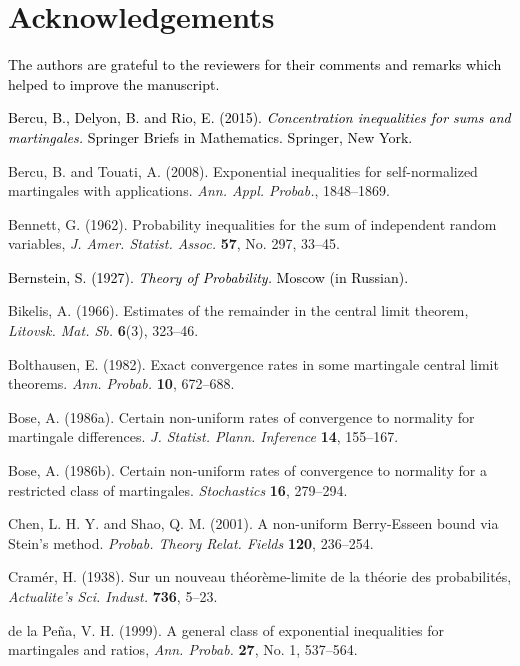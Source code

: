 \documentclass{gSTA2e}
\theoremstyle{plain}
\theoremstyle{definition}
\theoremstyle{remark}
\begin{document}
\section*{Acknowledgements}

\textcolor{black}{The authors are grateful to the reviewers for their comments and remarks which helped to improve the manuscript.}



\begin{thebibliography}{99}
 \textcolor{black}{Bercu, B., Delyon, B. and Rio, E. (2015). \emph{Concentration inequalities for sums and martingales.}
 Springer Briefs in Mathematics. Springer, New York.}

 Bercu, B. and Touati, A. (2008). Exponential inequalities for self-normalized martingales with applications. \emph{Ann. Appl. Probab.}, 1848--1869.


  Bennett, G. (1962). Probability inequalities for
the sum of independent random variables, \emph{J. Amer. Statist. Assoc.}
\textbf{57}, No. 297, 33--45.

 \textcolor{black}{Bernstein, S. (1927). \emph{Theory of Probability.} Moscow (in Russian).}

 Bikelis, A. (1966). Estimates of the remainder in the central limit theorem, \emph{Litovsk. Mat. Sb.}
\textbf{6}(3), 323--46.

 Bolthausen, E. (1982). Exact convergence rates in some
martingale central limit theorems. \emph{Ann. Probab.} \textbf{10},
672--688.

  Bose, A. (1986a). Certain non-uniform rates of
convergence to normality for martingale differences. \emph{J. Statist.
Plann. Inference} \textbf{14}, 155--167.

  Bose, A.  (1986b). Certain non-uniform rates of
convergence to normality for a restricted class of martingales. \emph{Stochastics} \textbf{16}, 279--294.

 Chen, L. H. Y. and Shao, Q. M. (2001). A non-uniform Berry-Esseen bound via Stein's
method. \emph{Probab. Theory Relat. Fields} \textbf{120}, 236--254.


 Cram\'{e}r, H. (1938). Sur un nouveau th\'{e}or\`{e}me-limite de la th\'{e}orie des probabilit\'{e}s, \emph{Actualite's Sci. Indust.} \textbf{736}, 5--23.

 de la Pe\~{n}a, V. H. (1999). A general class of exponential inequalities for martingales and ratios, \emph{Ann. Probab.} \textbf{27}, No. 1, 537--564.


\end{thebibliography}
\end{document}
